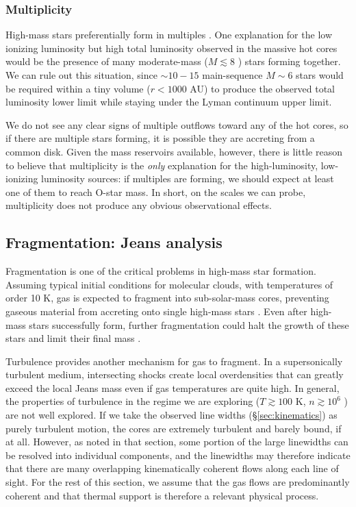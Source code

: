 \documentclass[twocolumn]{aastex61}
\begin{document}
\subsubsection{Multiplicity}
High-mass stars preferentially form in multiples \citep{Zinnecker2007a}.  One
explanation for the low ionizing luminosity but high total luminosity observed
in the massive hot cores would be the presence of many moderate-mass
($M\lesssim8$ \msun) stars forming together.  We can rule out this situation,
since $\sim10-15$ main-sequence $M\sim6$ \msun stars would be required within a
tiny volume ($r<1000$ AU) to produce the observed total luminosity lower limit
while staying under the Lyman continuum upper limit.


We do not see any clear signs of multiple outflows toward any of the hot cores,
so if there are multiple stars forming, it is possible they are accreting from
a common disk.
Given the mass reservoirs available, however, there is little reason
to believe that multiplicity is the \emph{only} explanation for the
high-luminosity, low-ionizing luminosity sources: if multiples are forming, we
should expect at least one of them to reach O-star mass.  In short, on the
scales we can probe, multiplicity does not produce any obvious observational
effects.



\subsection{Fragmentation: Jeans analysis}
\label{sec:fragmentation}
Fragmentation is one of the critical problems in high-mass star formation.
Assuming typical initial conditions for molecular clouds, with temperatures of
order 10 K, gas is expected to fragment into sub-solar-mass cores, preventing gaseous
material from accreting onto single high-mass stars \citep{Krumholz2015a}.
Even after high-mass stars successfully form, further fragmentation could
halt the growth of these stars and limit their final mass
\citep{Peters2010a,Girichidis2012b}.

Turbulence provides another mechanism for gas to fragment.  In a supersonically
turbulent medium, intersecting shocks create local overdensities that can
greatly exceed the local Jeans mass even if gas temperatures are quite high.
In general, the properties of turbulence in the regime we are exploring
($T\gtrsim100$ K, $n\gtrsim10^6$ \percc) are not well explored.  If we take the
observed line widths (\S \ref{sec:kinematics}) as purely turbulent motion, the
cores are extremely turbulent and barely bound, if at all.  However, as noted
in that section, some portion of the large linewidths can be resolved into
individual components, and the linewidths may therefore indicate that there are
many overlapping kinematically coherent flows along each line of sight.  For
the rest of this section, we assume that the gas flows are predominantly
coherent and that thermal support is therefore a relevant physical process.
\end{document}
